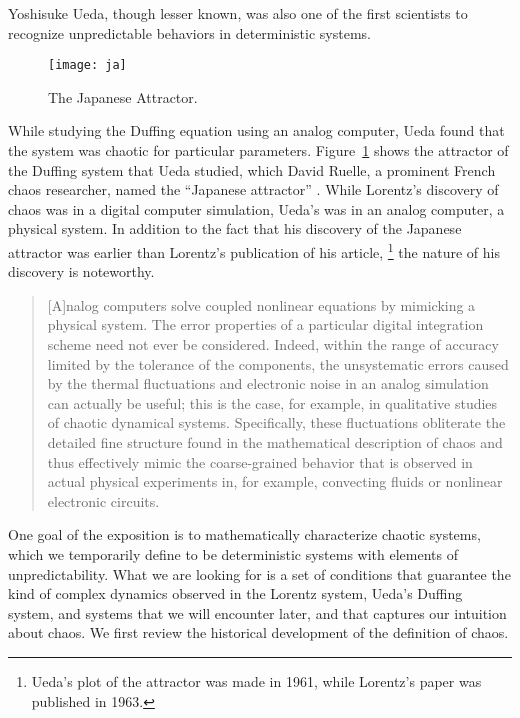 \documentclass[10pt,twoside,draft]{book}
\begin{document}
Yoshisuke Ueda, though lesser known, was also one of the first scientists to recognize unpredictable behaviors in deterministic systems.
\begin{figure}[ht]
  \centering
  \texttt{[image: ja]}
  \caption{The Japanese Attractor.}
  \label{fig:ja}
\end{figure}
While studying the Duffing equation using an analog computer, Ueda found that the system was chaotic for particular parameters.
Figure~\ref{fig:ja} shows the attractor of the Duffing system that Ueda studied, which David Ruelle, a prominent French chaos researcher, named the ``Japanese attractor'' \citep{ruelle}.
While Lorentz's discovery of chaos was in a digital computer simulation, Ueda's was in an analog computer, a physical system.
In addition to the fact that his discovery of the Japanese attractor was earlier than Lorentz's publication of his article,
\footnote{Ueda's plot of the attractor was made in 1961, while Lorentz's paper was published in 1963.}
the nature of his discovery is noteworthy.
\begin{quotation}
  [A]nalog computers solve coupled nonlinear equations by mimicking a physical system.
  The error properties of a particular digital integration scheme need not ever be considered.
  Indeed, within the range of accuracy limited by the tolerance of the components, the unsystematic errors caused by the thermal fluctuations and electronic noise in an analog simulation can actually be useful; this is the case, for example, in qualitative studies of chaotic dynamical systems.
  Specifically, these fluctuations obliterate the detailed fine structure found in the mathematical description of chaos and thus effectively mimic the coarse-grained behavior that is observed in actual physical experiments in, for example, convecting fluids or nonlinear electronic circuits.
  \citep[p.383]{campbell}
\end{quotation}


One goal of the exposition is to mathematically characterize chaotic systems, which we temporarily define to be deterministic systems with elements of unpredictability.
What we are looking for is a set of conditions that guarantee the kind of complex dynamics observed in the Lorentz system, Ueda's Duffing system, and systems that we will encounter later, and that captures our intuition about chaos.
We first review the historical development of the definition of chaos.
\end{document}
